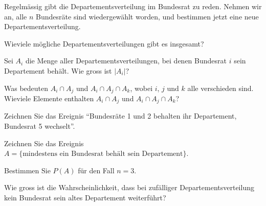 Regelmässig gibt die Departementsverteilung im Bundesrat zu reden.
Nehmen wir an, alle $n$ Bundesräte sind wiedergewählt worden,
und bestimmen jetzt eine neue Departementsverteilung.
\begin{teilaufgaben}
\item Wieviele mögliche Departementsverteilungen gibt es insgesamt?
\item Sei $A_i$ die Menge aller Departementsverteilungen, bei denen
Bundesrat $i$ sein Departement behält. Wie gross ist $|A_i|$?
\item Was bedeuten $A_i\cap A_j$ und $A_i\cap A_j\cap A_k$,
wobei $i$, $j$ und $k$ alle verschieden sind. Wieviele Elemente
enthalten $A_i\cap A_j$ und $A_i\cap A_j\cap A_k$?
\item Zeichnen Sie das Ereignis ``Bundesräte 1 und 2 behalten ihr Departement,
Bundesrat 5 wechselt''.
\item Zeichnen Sie das Ereignis $A=\{\text{mindestens ein Bundesrat behält sein Departement}\}$.
\item Bestimmen Sie $P(A)$ für den Fall $n=3$.
\item Wie gross ist die Wahrscheinlichkeit, dass bei zufälliger
Departementsverteilung kein Bundesrat sein altes Departement weiterführt?
\end{teilaufgaben}

